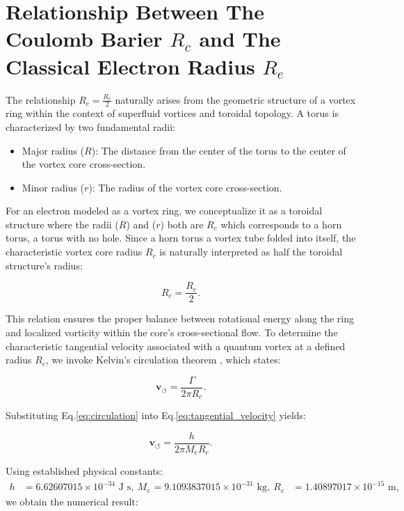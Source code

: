 \section{Relationship Between The Coulomb Barier $R_c$ and The Classical Electron Radius $R_e$ }
The relationship $R_c = \frac{R_e}{2}$ naturally arises from the geometric structure of a vortex ring within the context of superfluid vortices and toroidal topology. A torus is characterized by two fundamental radii:

\begin{itemize}
\item Major radius ($R$): The distance from the center of the torus to the center of the vortex core cross-section.
\item Minor radius ($r$): The radius of the vortex core cross-section.
\end{itemize}

For an electron modeled as a vortex ring, we conceptualize it as a toroidal structure where the radii ($R$) and ($r$) both are $R_c$ which corresponds to a horn torus, a torus with no hole. Since a horn torus a vortex tube folded into itself, the characteristic vortex core radius $R_c$ is naturally interpreted as half the toroidal structure's radius:

\begin{equation*}
R_c = \frac{R_e}{2}.
\end{equation*}

This relation ensures the proper balance between rotational energy along the ring and localized vorticity within the core's cross-sectional flow. To determine the characteristic tangential velocity associated with a quantum vortex at a defined radius  $ R_c $, we invoke Kelvin's circulation theorem \cite{donnelly_quantized_1991, tilley_superfluidity_1990}, which states:

\begin{equation*}
    \mathbf{v}_{\scriptscriptstyle\boldsymbol{\circlearrowleft}} = \frac{\Gamma}{2\pi R_c}.\label{eq:tangential_velocity}
\end{equation*}

Substituting Eq.\eqref{eq:circulation} into Eq.\eqref{eq:tangential_velocity} yields:

\begin{equation*}
    \mathbf{v}_{\scriptscriptstyle\boldsymbol{\circlearrowleft}} = \frac{h}{2\pi M_e R_c}.
    \label{eq:Ce_vorticity}
\end{equation*}

Using established physical constants:
\begin{align*}
h &= 6.62607015 \times 10^{-34} \text{ J s}, \
M_e &= 9.1093837015 \times 10^{-31} \text{ kg}, \
R_c &= 1.40897017 \times 10^{-15} \text{ m},
\end{align*}
we obtain the numerical result:

